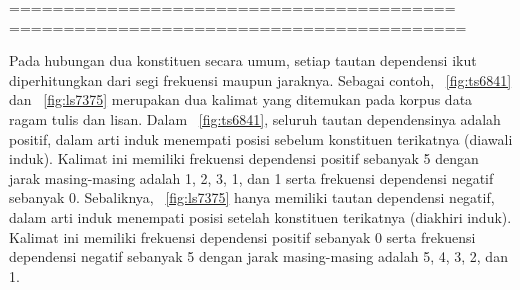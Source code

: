 \documentclass[10pt, a4paper, conference, compsocconf]{IEEEtran}
\begin{document}
=========================================
==========================================

Pada hubungan dua konstituen secara umum, setiap tautan dependensi ikut diperhitungkan dari segi frekuensi maupun jaraknya. Sebagai contoh, \pic~\ref{fig:ts6841} dan \pic~\ref{fig:ls7375} merupakan dua kalimat yang ditemukan pada korpus data ragam tulis dan lisan. Dalam \pic~\ref{fig:ts6841}, seluruh tautan dependensinya adalah positif, dalam arti induk menempati posisi sebelum konstituen terikatnya (diawali induk). Kalimat ini memiliki frekuensi dependensi positif sebanyak 5 dengan jarak masing-masing adalah 1, 2, 3, 1, dan 1 serta frekuensi dependensi negatif sebanyak 0. Sebaliknya, \pic~\ref{fig:ls7375} hanya memiliki tautan dependensi negatif, dalam arti induk menempati posisi setelah konstituen terikatnya (diakhiri induk). Kalimat ini memiliki frekuensi dependensi positif sebanyak 0 serta frekuensi dependensi negatif sebanyak 5 dengan jarak masing-masing adalah 5, 4, 3, 2, dan 1.
\end{document}
